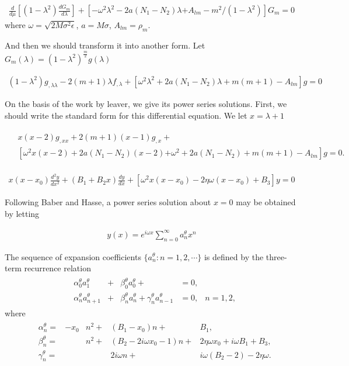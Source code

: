 \documentclass[11pt]{diazessay} %
\begin{document}
\begin{align}
    \frac{d}{d \mu}\left[\left(1-\lambda^2\right) \frac{d G_m}{d \lambda}\right]+\left[-\omega^2 \lambda^2-2 a\left(N_1-N_2\right) \lambda\right. 
    \left.+A_{l m}-m^2 /\left(1-\lambda^2\right)\right] G_m=0
\end{align}
where $\omega=\sqrt{2M\sigma^2 \epsilon}$, $a=M\sigma$, $A_{lm}=\rho_m$.

And then we should transform it into another form. Let $G_m(\lambda)=(1-\lambda^2)^{\frac{m}{2}}g(\lambda)$ 

\begin{align}
    (1-\lambda^2)g_{,\lambda\lambda}-2(m+1)\lambda f_{,\lambda}+\left[\omega^2\lambda^2+2a(N_1-N_2)\lambda+m(m+1)-A_{lm} \right]g=0
\end{align}

On the basis of the work by leaver, we give its power series solutions. First, we should write the standard form for this differential equation. We let $x=\lambda+1$

\begin{align}
    \begin{aligned}
        &x(x  -2) g_{, x x}+2(m+1)(x-1) g_{, x} +\\
        &\left[\omega^2 x(x-2)+2 a\left(N_1-N_2\right)(x-2)\right.  \left.+\omega^2+2 a\left(N_1-N_2\right)+m(m+1)-A_{l m}\right] g=0 .
    \end{aligned}
\end{align}

\begin{align}
    x(x-x_0)\frac{d^2y}{dx^2}+(B_1+B_2x)\frac{dy}{dx}+\left[\omega^2x(x-x_0)-2\eta \omega (x-x_0)+B_3\right]y=0
\end{align}

Following Baber and Hasse, a power series solution about $x=0$ may be obtained by letting 

\begin{align}
    y(x)=e^{i\omega x}\sum_{n=0}^{\infty}a^\theta_nx^n
\end{align}

The sequence of expansion coefficients $\{a^\theta_n:n=1,2,\cdots\}$ is defined by the three-term recurrence relation
\begin{align}
    \begin{aligned}
        &\alpha_0^\theta a_1^\theta&+&\beta_0^\theta a_0^\theta+&=0,&\\
        &\alpha_n^\theta a_{n+1}^\theta&+&\beta_n^\theta a_n^\theta+\gamma_n^\theta a_{n-1}^\theta&=0,&n=1,2, 
    \end{aligned}
\end{align}
where
\begin{align}
    \begin{aligned}
        &\alpha_n^\theta =&-x_0 &n^2+& \left(B_1-x_0\right) n+             &B_1, \\
    &\beta_n^\theta  =&     &n^2+& \left(B_2-2 i \omega x_0-1\right) n+&2 \eta \omega x_0+i \omega B_1+B_3, \\
    &\gamma_n^\theta =&     &    & 2 i \omega n+                       &i \omega\left(B_2-2\right)-2 \eta \omega .
    \end{aligned}
\end{align}
\end{document}
